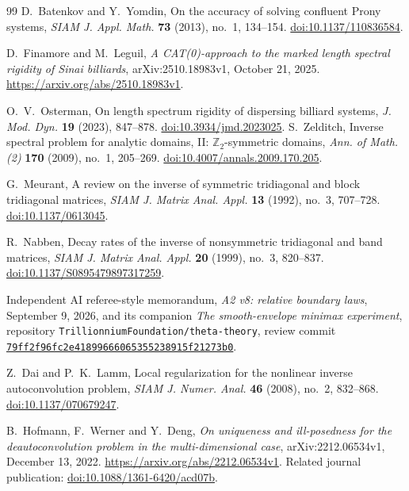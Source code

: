 \begin{thebibliography}{99}
D.~Batenkov and Y.~Yomdin, On the accuracy of solving confluent Prony
systems, \emph{SIAM J. Appl. Math.} \textbf{73} (2013), no.~1,
134--154. \href{https://doi.org/10.1137/110836584}{doi:10.1137/110836584}.

D.~Finamore and M.~Leguil, \emph{A CAT(0)-approach to the marked
length spectral rigidity of Sinai billiards}, arXiv:2510.18983v1,
October 21, 2025. \url{https://arxiv.org/abs/2510.18983v1}.

O.~V.~Osterman, On length spectrum rigidity of dispersing billiard
systems, \emph{J. Mod. Dyn.} \textbf{19} (2023), 847--878.
\href{https://doi.org/10.3934/jmd.2023025}{doi:10.3934/jmd.2023025}.
S.~Zelditch, Inverse spectral problem for analytic domains, II:
$\mathbb Z_2$-symmetric domains, \emph{Ann. of Math. (2)}
\textbf{170} (2009), no.~1, 205--269.
\href{https://doi.org/10.4007/annals.2009.170.205}{doi:10.4007/annals.2009.170.205}.

G.~Meurant, A review on the inverse of symmetric tridiagonal and
block tridiagonal matrices, \emph{SIAM J. Matrix Anal. Appl.}
\textbf{13} (1992), no.~3, 707--728.
\href{https://doi.org/10.1137/0613045}{doi:10.1137/0613045}.

R.~Nabben, Decay rates of the inverse of nonsymmetric tridiagonal and
band matrices, \emph{SIAM J. Matrix Anal. Appl.} \textbf{20} (1999),
no.~3, 820--837.
\href{https://doi.org/10.1137/S0895479897317259}{doi:10.1137/S0895479897317259}.

Independent AI referee-style memorandum, \emph{A2 v8: relative
boundary laws}, September 9, 2026, and its companion
\emph{The smooth-envelope minimax experiment}, repository
\texttt{TrillionniumFoundation/theta-theory}, review commit
\href{https://github.com/TrillionniumFoundation/theta-theory/commit/79ff2f96fc2e41899666065355238915f21273b0}{\texttt{79ff2f96fc2e41899666065355238915f21273b0}}.

Z.~Dai and P.~K.~Lamm, Local regularization for the nonlinear inverse
autoconvolution problem, \emph{SIAM J. Numer. Anal.} \textbf{46}
(2008), no.~2, 832--868.
\href{https://doi.org/10.1137/070679247}{doi:10.1137/070679247}.

B.~Hofmann, F.~Werner and Y.~Deng, \emph{On uniqueness and
ill-posedness for the deautoconvolution problem in the multi-dimensional
case}, arXiv:2212.06534v1, December 13, 2022.
\url{https://arxiv.org/abs/2212.06534v1}.
Related journal publication: \href{https://doi.org/10.1088/1361-6420/acd07b}{doi:10.1088/1361-6420/acd07b}.


\end{thebibliography}
